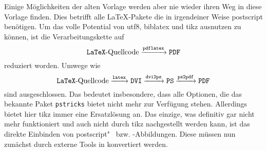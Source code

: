 Einige Möglichkeiten der alten Vorlage werden aber nie wieder ihren Weg in diese
Vorlage finden. Dies betrifft alle LaTeX-Pakete die in irgendeiner Weise
\gls{postscript} benötigen. Um das volle Potential von \gls{utf8}, \gls{biblatex} und
\gls{tikz} ausnutzen zu können, ist die Verarbeitungskette auf
\begin{equation*}
\text{\texttt{LaTeX}-Quellcode} \xrightarrow{\text{\texttt{pdflatex}}} \text{\texttt{PDF}}
\end{equation*}
reduziert worden. Umwege wie
\begin{equation*}
\text{\texttt{LaTeX}-Quellcode} \xrightarrow{\text{\texttt{latex}}} \text{\texttt{DVI}} \xrightarrow{\text{\texttt{dvi2ps}}} \text{\texttt{PS}} \xrightarrow{\text{\texttt{ps2pdf}}} \text{\texttt{PDF}}
\end{equation*}
sind ausgeschlossen. Das bedeutet insbesondere, dass alle Optionen, die das
bekannte Paket \texttt{pstricks} bietet nicht mehr zur Verfügung
stehen. Allerdings bietet hier \gls{tikz} immer eine Ersatzlösung an. Das
einzige, was definitiv gar nicht mehr funktioniert und auch nicht durch
\gls{tikz} nachgestellt werden kann, ist das direkte Einbinden von
\gls{postscript}"~ bzw. -Abbildungen. Diese
müssen nun zunächst durch externe Tools in  konvertiert werden.

